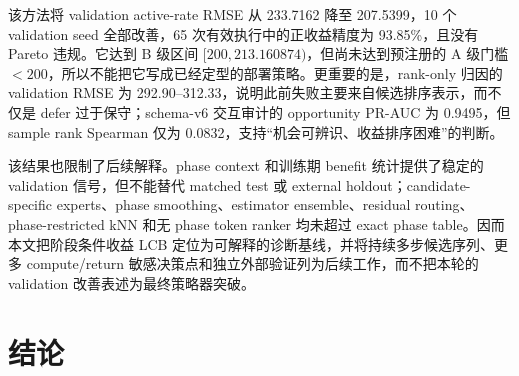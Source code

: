 \documentclass[letterpaper,journal]{IEEEtran}
\begin{document}
该方法将 validation active-rate RMSE 从 233.7162 降至 207.5399，10 个 validation seed 全部改善，65 次有效执行中的正收益精度为 93.85\%，且没有 Pareto 违规。它达到 B 级区间 $[200,213.160874)$，但尚未达到预注册的 A 级门槛 $<200$，所以不能把它写成已经定型的部署策略。更重要的是，rank-only 归因的 validation RMSE 为 292.90--312.33，说明此前失败主要来自候选排序表示，而不仅是 defer 过于保守；schema-v6 交互审计的 opportunity PR-AUC 为 0.9495，但 sample rank Spearman 仅为 0.0832，支持“机会可辨识、收益排序困难”的判断。

该结果也限制了后续解释。phase context 和训练期 benefit 统计提供了稳定的 validation 信号，但不能替代 matched test 或 external holdout；candidate-specific experts、phase smoothing、estimator ensemble、residual routing、phase-restricted kNN 和无 phase token ranker 均未超过 exact phase table。因而本文把阶段条件收益 LCB 定位为可解释的诊断基线，并将持续多步候选序列、更多 compute/return 敏感决策点和独立外部验证列为后续工作，而不把本轮的 validation 改善表述为最终策略器突破。

\section{结论}
\end{document}

